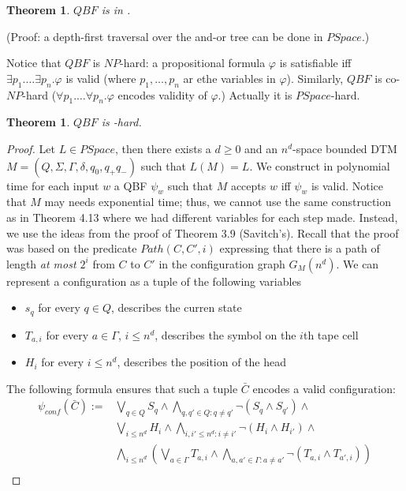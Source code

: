 \documentclass{report}
\newcommand{\NP}{\text{$\mathit{NP}$}\xspace}
\newcommand{\PSpace}{\text{$\mathit{PSpace}$}\xspace}
\newtheorem{theorem}[definition]{Theorem}
\begin{document}
\begin{theorem} $QBF$ is in \PSpace.
\end{theorem}
(Proof: a depth-first traversal over the and-or tree can be done in $PSpace$.)

Notice that $QBF$ is $\NP$-hard: a propositional formula $\varphi$ is satisfiable iff $\exists p_1. \ldots \exists p_n.\varphi$ is valid (where $p_1,\ldots, p_n$ ar ethe variables in $\varphi$). Similarly, $QBF$ is co-$NP$-hard ($\forall p_1. \ldots \forall p_n.\varphi$ encodes validity of $\varphi$.) Actually it is $PSpace$-hard. 

\begin{theorem} $QBF$ is \PSpace-hard.
\end{theorem}

\begin{proof}
Let $L \in PSpace$, then there exists a $d \geq 0$ and an $n^d$-space bounded DTM $M = (Q, \Sigma, \Gamma, \delta, q_0, q_+ q_-)$ such that $L(M) = L$. We construct in polynomial time for each input $w$ a QBF $\psi_w$ such that $M$ accepts $w$ iff $\psi_w$ is valid. Notice that $M$ may needs exponential time; thus, we cannot use the same construction as in Theorem 4.13 where we had different variables for each step made. Instead, we use the ideas from the proof of Theorem 3.9 (Savitch's). Recall that the proof was based on the predicate $Path(C,C',i)$ expressing that there is a path of length \emph{at most $2^i$} from $C$ to $C'$ in the configuration graph $G_M(n^d)$. We can represent a configuration as a tuple of the following variables
\begin{itemize}
 \item $s_q$ for every $q \in Q$, describes the curren state
 \item $T_{a,i}$ for every $a \in \Gamma$, $i \leq n^d$, describes the symbol on the $i$th tape cell
 \item $H_i$ for every $i \leq n^d$, describes the position of the head
\end{itemize}
The following formula ensures that such a tuple $\bar{C}$ encodes a valid configuration:
\begin{align*}
 \psi_{\mathit{conf}}(\bar{C}) := {}& \bigvee_{q \in Q} S_q \land \bigwedge_{q, q' \in Q\colon q \neq q'} \neg (S_q \land S_{q'}) \land \\
 & \bigvee_{i \leq n^d} H_i \land \bigwedge_{i, i' \leq n^d \colon i \neq i'} \neg (H_i \land H_{i'}) \land \\
 & \bigwedge_{i \leq n^d} \left(\bigvee_{a \in \Gamma} T_{a,i} \land \bigwedge_{a, a' \in \Gamma \colon a \neq a'} \neg ( T_{a,i} \land T_{a', i}) \right)\\

\end{align*}
\end{proof}
\end{document}
